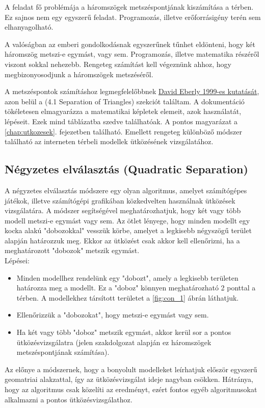 
A feladat fő problémája a háromszögek metszéspontjának kiszámítása a térben. Ez sajnos nem egy egyszerű feladat. Programozás, illetve erőforrásigény terén sem elhanyagolható.

A valóságban az emberi gondolkodásnak egyszerűnek tűnhet eldönteni, hogy két háromszög metszi-e egymást, vagy sem. Programozás, illetve matematika részéről viszont sokkal nehezebb. Rengeteg számítást kell végeznünk ahhoz, hogy megbizonyosodjunk a háromszögek metszéséről.

A metszéspontok számításhoz legmegfelelőbbnek \href{https://www.geometrictools.com/Documentation/DynamicCollisionDetection.pdf}{David Eberly 1999-es kutatását}, azon belül a \cite{triangles}(4.1 Separation of Triangles) szekciót találtam. A dokumentáció tökéletesen elmagyarázza a matematikai képletek elemeit, azok használatát, lépéseit. Ezek mind táblázatba szedve találhatóak. A pontos magyarázat a \ref{chap:utkozesek}. fejezetben található. Emellett rengeteg különböző módszer található az interneten térbeli modellek ütközésének vizsgálatához.\\
\newpage
\subsection{Négyzetes elválasztás (Quadratic Separation)}
A négyzetes elválasztás módszere egy olyan algoritmus, amelyet számítógépes játékok, illetve számítógépi grafikában közkedvelten használnak ütközések vizsgálatára.
A módszer segítségével meghatározhatjuk, hogy két vagy több modell metszi-e egymást vagy sem.
Az ötlet lényege, hogy minden modellt egy kocka alakú "dobozokkal" vesszük körbe, amelyet a legkisebb négyszögű terület alapján határozzuk meg. Ekkor az ütközést csak akkor kell ellenőrizni, ha a meghatározott "dobozok" metszik egymást.\\
Lépései:
\begin{itemize}
\item Minden modellhez rendelünk egy "dobozt", amely a legkisebb területen határozza meg a modellt. Ez a "doboz" könnyen meghatározható 2 ponttal a térben. A modellekhez társított területet a \ref{fig:con_1} ábrán láthatjuk.

\item Ellenőrizzük a "dobozokat", hogy metszi-e egymást vagy sem.

\item Ha két vagy több "doboz" metszik egymást, akkor kerül sor a pontos ütközésvizsgálatra (jelen szakdolgozat alapján ez háromszögek metszéspontjának számítása).
\end{itemize}
Az előnye a módszernek, hogy a bonyolult modelleket leírhatjuk először egyszerű geomatriai alakzattal, így az ütközésvizsgálat ideje nagyban csökken. Hátránya, hogy az algoritmus csak közelíti az eredményt, ezért fontos egyéb algoritmusokat alkalmazni a pontos ütközésvizsgálathoz.

